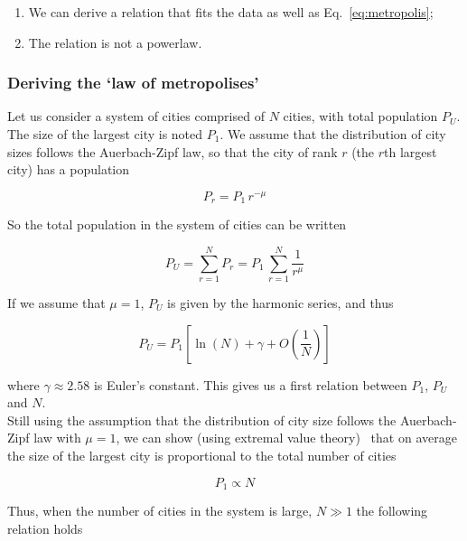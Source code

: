 \begin{enumerate}
    \item We can derive a relation that fits the data as well as
        Eq.~\ref{eq:metropolis};
    \item The relation is not a powerlaw.
\end{enumerate}



\subsubsection{Deriving the `law of metropolises'}
\label{sub:deriving_the_law_of_metropolises_}

Let us consider a system of cities comprised of $N$ cities, with total
population $P_U$. The size of the largest city is noted $P_1$. We assume that
the distribution of city sizes follows the Auerbach-Zipf law, so that the city
of rank $r$ (the $r$th largest city) has a population

\begin{equation*}
    P_r = P_1\,r^{-\mu}
\end{equation*}

So the total population in the system of cities can be written

\begin{equation}
    P_U = \sum_{r=1}^N P_r = P_1\,\sum_{r=1}^{N} \frac{1}{r^\mu}
\end{equation}

If we assume that $\mu=1$, $P_U$ is given by the harmonic series, and thus

\begin{equation}
    P_U = P_1 \left[ \ln(N) + \gamma + O\left(\frac{1}{N}\right)\right]
\end{equation}

where $\gamma \approx 2.58$ is Euler's constant. This gives us a first relation
between $P_1$, $P_U$ and $N$.\\

Still using the assumption that the distribution of city size follows the
Auerbach-Zipf law with $\mu=1$, we can show (using extremal value
theory)~\cite{Clauset:2009} that on average the size of the largest city is proportional to the total
number of cities

\begin{equation*}
    P_1 \propto N
\end{equation*}

Thus, when the number of cities in the system is large, $N \gg 1$ the following
relation holds 


